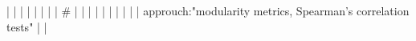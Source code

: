 |    |            |      |                                                                      |                                                                                                                                                                          |                                                                                                                                                                                                                                                            |                                                                                                                                                                                                                                                                      |  #                                                                                                                                                                                                                                                                                                       |                                                                                                                                                                                                                                                                                                                                                                                                                                                                                              |
|    |            |      |                                                                      |                                                                                                                                                                          |                                                                                                                                                                                                                                                            |                                                                                                                                                                                                                                                                      |  approuch:"modularity metrics, Spearman’s correlation tests"                                                                                                                                                                                                                                             |                                                                                                                                                                                                                                                                                                                                                                                                                                                                                              |
